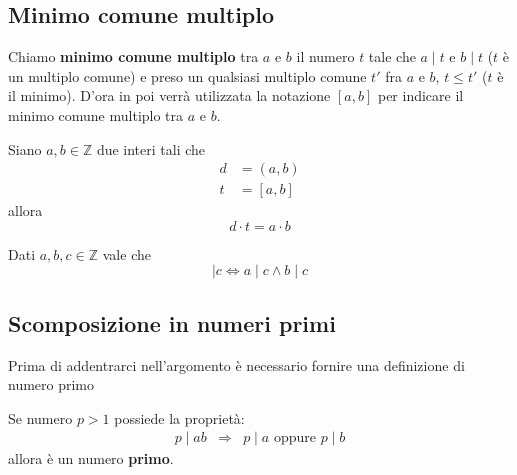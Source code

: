 \subsection{Minimo comune multiplo}

\begin{defn}
	Chiamo \textbf{minimo comune multiplo} tra $a$ e $b$ il numero $t$ tale che $a \mid t$
	e $b \mid t$ ($t$ \`e un multiplo comune) e preso un qualsiasi multiplo comune $t'$ fra
	$a$ e $b$, $t \leq t'$ ($t$ \`e il minimo). D'ora in poi verr\`a utilizzata la notazione
	$[a, b]$ per indicare il minimo comune multiplo tra $a$ e $b$.
\end{defn}

\begin{proposition}
	Siano $a, b \in \mathbb{Z}$ due interi tali che
	\begin{equation*}
		\begin{array}{ll}
			d & = (a, b) \\
			t & = [a, b]
		\end{array}
	\end{equation*}
	allora
	\begin{equation*}
		d \cdot t = a \cdot b
	\end{equation*}
\end{proposition}

\begin{proposition}
	Dati $a, b, c \in \mathbb{Z}$ vale che
	\begin{equation*}
		[a, b] \mid c \Leftrightarrow a \mid c \wedge b \mid c
	\end{equation*}
\end{proposition}

\subsection{Scomposizione in numeri primi}
Prima di addentrarci nell'argomento \`e necessario fornire una definizione di numero primo

\begin{defn}
	Se numero $p > 1$ possiede la propriet\`a:
	\begin{equation*}
		\begin{array}{rcl}
			p \mid ab & \Rightarrow & p \mid a \text{ oppure } p \mid b
		\end{array}
	\end{equation*}
	allora \`e un numero \textbf{primo}.
\end{defn}

